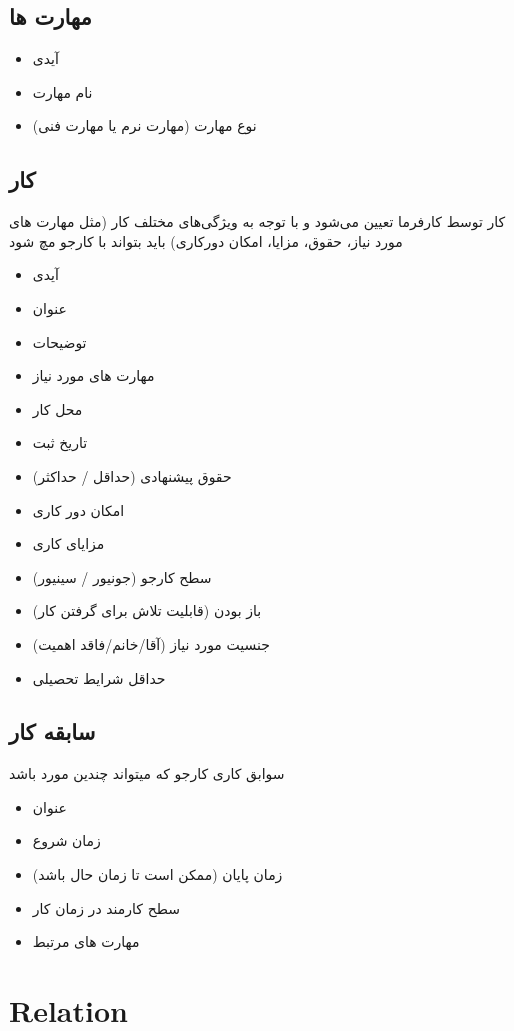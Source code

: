 \documentclass{article}
\begin{document}
	\subsection{مهارت ها}
	\begin{itemize}
		\item آیدی
		\item نام مهارت
		\item نوع مهارت (مهارت نرم یا مهارت فنی)
\end{itemize}

	\subsection{کار}
	 کار توسط کارفرما تعیین می‌شود و با توجه به ویژگی‌های مختلف کار (مثل مهارت های مورد نیاز، حقوق، مزایا، امکان دورکاری) باید بتواند با کارجو مچ شود 
	 \begin{itemize}
	 	        \item آیدی
	 	\item عنوان
	 	\item توضیحات
	 	\item مهارت های مورد نیاز
	 	\item محل کار
	 	\item تاریخ ثبت
	 	\item حقوق پیشنهادی (حداقل / حداکثر)
	 	\item امکان دور کاری
	 	\item مزایای کاری
	 	\item سطح کارجو (جونیور / سینیور)
	 	\item باز بودن (قابلیت تلاش برای گرفتن کار)
	 	\item جنسیت مورد نیاز (آقا/خانم/فاقد اهمیت)
	 	\item حداقل شرایط تحصیلی
	\end{itemize}
\subsection{سابقه کار}
سوابق کاری کارجو که میتواند چندین مورد باشد
\begin{itemize}
	        \item عنوان
	\item زمان شروع
	\item زمان پایان (ممکن است تا زمان حال باشد)
	\item سطح کارمند در زمان کار
	\item مهارت های مرتبط
\end{itemize}
\section{Relation}
\end{document}
